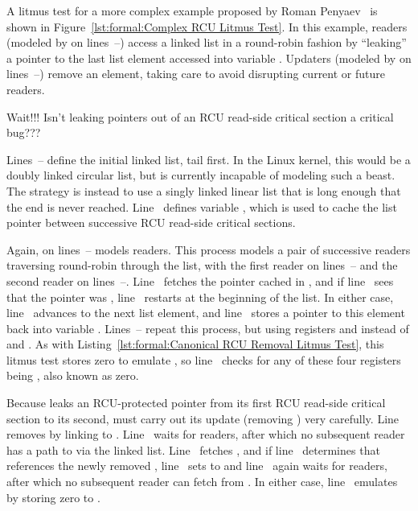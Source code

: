 \begin{lineref}
A litmus test for a more complex example proposed by
Roman Penyaev~\cite{RomanPenyaev2018rrRCU} is shown in
Figure~\ref{lst:formal:Complex RCU Litmus Test}.
In this example, readers (modeled by  on
lines~--) access a linked list
in a round-robin fashion by ``leaking'' a pointer to the last
list element accessed into variable .
Updaters (modeled by  on lines~--)
remove an element, taking care to avoid disrupting current or future
readers.

\QuickQuiz{}
	Wait!!!
	Isn't leaking pointers out of an RCU read-side critical
	section a critical bug???
 \QuickQuizEnd

Lines~-- define the initial linked
list, tail first.
In the Linux kernel, this would be a doubly linked circular list,
but  is currently incapable of modeling such a beast.
The strategy is instead to use a singly linked linear list that
is long enough that the end is never reached.
Line~ defines variable , which is used to
cache the list pointer between successive RCU read-side critical
sections.

Again,  on lines~-- models readers.
This process models a pair of successive readers traversing round-robin
through the list, with the first reader on lines~--
and the second reader on lines~--.
Line~ fetches the pointer cached in , and if
line~ sees that the pointer was ,
line~ restarts at the beginning of the list.
In either case, line~ advances to the next list element,
and line~ stores a pointer to this element back into
variable .
Lines~-- repeat this process, but using
registers  and  instead of  and .
As with
Listing~\ref{lst:formal:Canonical RCU Removal Litmus Test},
this litmus test stores zero to emulate , so
line~ checks for any of these four registers being
, also known as zero.

Because  leaks an RCU-protected pointer from its first
RCU read-side critical section to its second,  must carry
out its update (removing ) very carefully.
Line~ removes  by linking  to .
Line~ waits for readers, after which no subsequent reader
has a path to  via the linked list.
Line~ fetches , and if line~
determines that  references the newly removed ,
line~ sets  to 
and line~ again waits for readers, after which no
subsequent reader can fetch  from .
In either case, line~ emulates  by storing
zero to .


\end{lineref}
